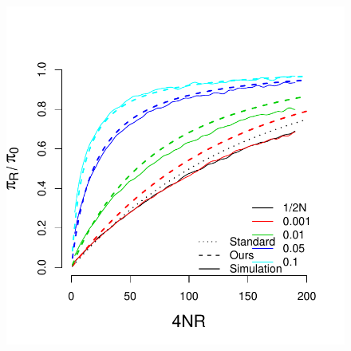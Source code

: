 \documentclass[a4paper,10pt]{article}
\begin{document}
\begin{figure}
	\includegraphics[width = \textwidth]{../Paper_Figures/pi_density.pdf} \label{pi_plot}
\end{figure}
\end{document}
